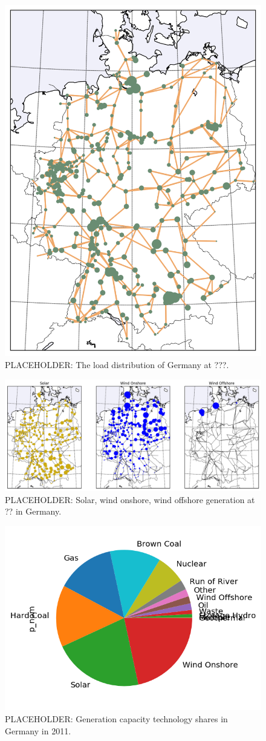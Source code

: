 \documentclass[main.tex]{subfiles}
\begin{document}


\begin{figure}
    \centering
    \includegraphics[width=.4\textwidth]{img/load.png}
    \caption{PLACEHOLDER: The load distribution of Germany at ???.}
    \label{fig:loaddistribution}
\end{figure}
\begin{figure}
    \centering
    \includegraphics[width=\textwidth]{img/solarwind.png}
    \caption{PLACEHOLDER: Solar, wind onshore, wind offshore generation at ?? in Germany.}
    \label{fig:solarwind}
\end{figure}
\begin{figure}
    \centering
    \includegraphics[width=.4\textwidth]{img/genprop.png}
    \caption{PLACEHOLDER: Generation capacity technology shares in Germany in 2011.}
    \label{fig:generationtech}
\end{figure}
\end{document}
